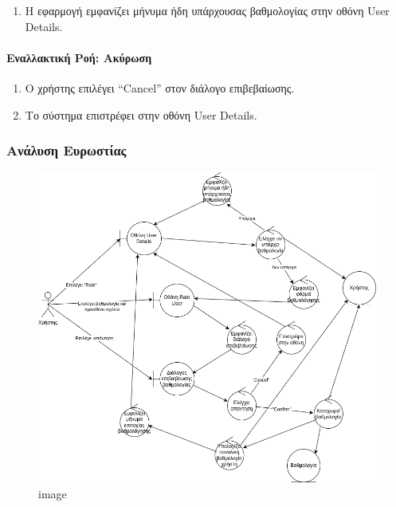 \begin{enumerate}
\def\labelenumi{\arabic{enumi}.}
\setcounter{enumi}{2}
\tightlist
\item
  H εφαρμογή εμφανίζει μήνυμα ήδη υπάρχουσας βαθμολογίας στην οθόνη User
  Details.
\end{enumerate}

\hypertarget{ux3b5ux3bdux3b1ux3bbux3bbux3b1ux3baux3c4ux3b9ux3baux3ae-ux3c1ux3bfux3ae-ux3b1ux3baux3cdux3c1ux3c9ux3c3ux3b7}{%
\paragraph{Εναλλακτική Ροή:
Ακύρωση}\label{ux3b5ux3bdux3b1ux3bbux3bbux3b1ux3baux3c4ux3b9ux3baux3ae-ux3c1ux3bfux3ae-ux3b1ux3baux3cdux3c1ux3c9ux3c3ux3b7}}

\begin{enumerate}
\def\labelenumi{\arabic{enumi}.}
\setcounter{enumi}{5}
\tightlist
\item
  Ο χρήστης επιλέγει ``Cancel'' στον διάλογο επιβεβαίωσης.
\item
  Το σύστημα επιστρέφει στην οθόνη User Details.
\end{enumerate}

\hypertarget{ux3b1ux3bdux3acux3bbux3c5ux3c3ux3b7-ux3b5ux3c5ux3c1ux3c9ux3c3ux3c4ux3afux3b1ux3c2}{%
\subsubsection{Ανάλυση
Ευρωστίας}\label{ux3b1ux3bdux3acux3bbux3c5ux3c3ux3b7-ux3b5ux3c5ux3c1ux3c9ux3c3ux3c4ux3afux3b1ux3c2}}

\begin{figure}
\centering
\includegraphics{./rate-user-robustness.drawio.png}
\caption{image}
\end{figure}
